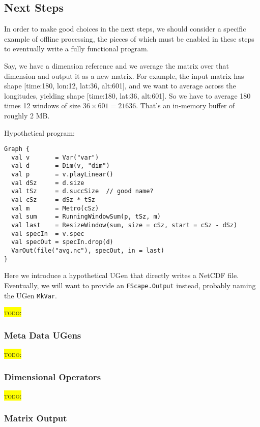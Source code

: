 \documentclass[11pt,a4paper]{article}
\newcommand{\todo}[1]{\colorbox{yellow}{\textsc{todo}: #1}}
\begin{document}
\subsection{Next Steps}

In order to make good choices in the next steps, we should consider a specific example of offline processing, the pieces of which must be enabled in these steps to eventually write a fully functional program.

Say, we have a dimension reference and we average the matrix over that dimension and output it as a new matrix. For example, the input matrix has shape [time:180, lon:12, lat:36, alt:601], and we want to average across the longitudes, yielding shape [time:180, lat:36, alt:601]. So we have to average 180 times 12 windows of size $36 \times 601 = 21636$. That's an in-memory buffer of roughly 2 MB.

Hypothetical program:
%
\begin{lstlisting}[style=scala]
Graph {
  val v       = Var("var")
  val d       = Dim(v, "dim")
  val p       = v.playLinear()
  val dSz     = d.size
  val tSz     = d.succSize  // good name?
  val cSz     = dSz * tSz
  val m       = Metro(cSz)
  val sum     = RunningWindowSum(p, tSz, m)
  val last    = ResizeWindow(sum, size = cSz, start = cSz - dSz)
  val specIn  = v.spec
  val specOut = specIn.drop(d)
  VarOut(file("avg.nc"), specOut, in = last)
}
\end{lstlisting}

Here we introduce a hypothetical UGen that directly writes a NetCDF file. Eventually, we will want to provide an \Verb!FScape.Output! instead, probably naming the UGen \Verb!MkVar!.

\todo{}

\subsubsection{Meta Data UGens}

\todo{}

\subsubsection{Dimensional Operators}

\todo{}

\subsubsection{Matrix Output}
\end{document}
